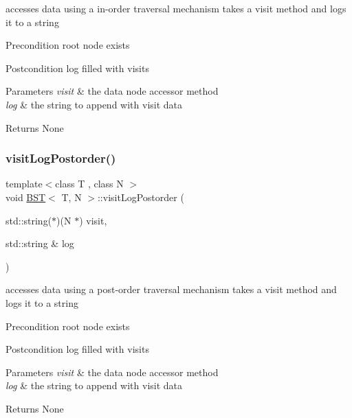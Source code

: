 accesses data using a in-\/order traversal mechanism takes a visit method and logs it to a string \begin{DoxyPrecond}{Precondition}
root node exists 
\end{DoxyPrecond}
\begin{DoxyPostcond}{Postcondition}
log filled with visits 
\end{DoxyPostcond}

\begin{DoxyParams}{Parameters}
{\em visit} & the data node accessor method \\
\hline
{\em log} & the string to append with visit data \\
\hline
\end{DoxyParams}
\begin{DoxyReturn}{Returns}
None 
\end{DoxyReturn}
\mbox{\label{class_b_s_t_a831b6fdcda13b7a353e03992b9c965b7}} 
\subsubsection{\texorpdfstring{visit\+Log\+Postorder()}{visitLogPostorder()}}
{\footnotesize\ttfamily template$<$class T , class N $>$ \\
void \hyperlink{class_b_s_t}{B\+ST}$<$ T, N $>$\+::visit\+Log\+Postorder (\begin{DoxyParamCaption}\item[{std\+::string($\ast$)(N $\ast$)}]{visit,  }\item[{std\+::string \&}]{log }\end{DoxyParamCaption})}

accesses data using a post-\/order traversal mechanism takes a visit method and logs it to a string \begin{DoxyPrecond}{Precondition}
root node exists 
\end{DoxyPrecond}
\begin{DoxyPostcond}{Postcondition}
log filled with visits 
\end{DoxyPostcond}

\begin{DoxyParams}{Parameters}
{\em visit} & the data node accessor method \\
\hline
{\em log} & the string to append with visit data \\
\hline
\end{DoxyParams}
\begin{DoxyReturn}{Returns}
None 
\end{DoxyReturn}
\mbox{\label{class_b_s_t_a7ed3924d6f70e52c7a6bc1d5bddbb31d}} 

